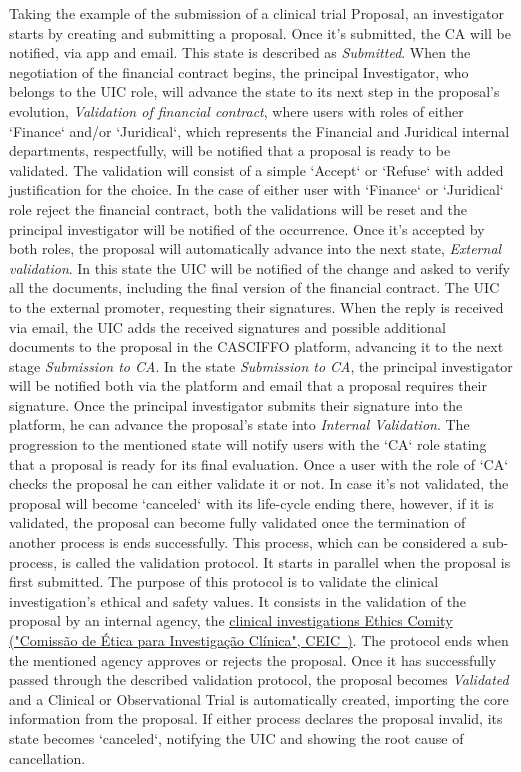 Taking the example of the submission of a clinical trial Proposal, an investigator starts by creating and submitting a proposal. Once it's submitted, the CA will be notified, via app and email. This state is described as \textit{Submitted}.  
When the negotiation of the financial contract begins, the principal Investigator, who belongs to the UIC role, will advance the state to its next step in the proposal's evolution, \textit{Validation of financial contract}, where users with roles of either `Finance` and/or `Juridical`, which represents the Financial and Juridical internal departments, respectfully, will be notified that a proposal is ready to be validated. The validation will consist of a simple `Accept` or `Refuse` with added justification for the choice. In the case of either user with `Finance` or `Juridical` role reject the financial contract, both the validations will be reset and the principal investigator will be notified of the occurrence.  
Once it's accepted by both roles, the proposal will automatically advance into the next state, \textit{External validation}. In this state the UIC will be notified of the change and asked to verify all the documents, including the final version of the financial contract. The UIC to the external promoter, requesting their signatures. When the reply is received via email, the UIC adds the received signatures and possible additional documents to the proposal in the CASCIFFO platform, advancing it to the next stage \textit{Submission to CA}.  
In the state \textit{Submission to CA}, the principal investigator will be notified both via the platform and email that a proposal requires their signature. Once the principal investigator submits their signature into the platform, he can advance the proposal's state into \textit{Internal Validation}. The progression to the mentioned state will notify users with the `CA` role stating that a proposal is ready for its final evaluation.  
Once a user with the role of `CA` checks the proposal he can either validate it or not. In case it's not validated, the proposal will become `canceled` with its life-cycle ending there, however, if it is validated, the proposal can become fully validated once the termination of another process is ends successfully.  
This process, which can be considered a sub-process, is called the validation protocol. It starts in parallel when the proposal is first submitted.  
The purpose of this protocol is to validate the clinical investigation's ethical and safety values. It consists in the validation of the proposal by an internal agency, the \href{https://www.ceic.pt/}{clinical investigations Ethics Comity ("Comissão de Ética para Investigação Clínica", CEIC~\cite{ceic})}. The protocol ends when the mentioned agency approves or rejects the proposal.  
Once it has successfully passed through the described validation protocol, the proposal becomes \textit{Validated} and a Clinical or Observational Trial is automatically created, importing the core information from the proposal.  
If either process declares the proposal invalid, its state becomes `canceled`, notifying the UIC and showing the root cause of cancellation.

